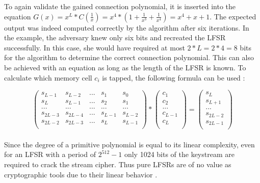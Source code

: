 To again validate the gained connection polynomial, it is inserted into the equation $G(x) = x^L * C(\frac{1}{x}) = x^4 * (1 + \frac{1}{x^3} + \frac{1}{x^4}) = x^4 + x + 1$. The expected output was indeed computed correctly by the algorithm after six iterations. In the example, the adversary knew only six bits and recreated the LFSR successfully. In this case, she would have required at most $2*L=2*4=8$ bits for the algorithm to determine the correct connection polynomial. This can also be achieved with an equation as long as the length of the LFSR is known. To calculate which memory cell $c_i$ is tapped, the following formula can be used \cite[p. 232]{Smart.2016}:

\[
	\begin{pmatrix}
		s_{L-1} & s_{L-2} & ... & s_1 & s_0 \\
		s_L & s_{L-1} & ... & s_2 & s_1 \\
		... & ... & ... & ... & ... \\
		s_{2L-3} & s_{2L-4} & ... & s_{L-1} & s_{L-2} \\
		s_{2L-2} & s_{2L-3} & ... & s_L & s_{L-1} \\
	\end{pmatrix} *
	\begin{pmatrix}
		c_1 \\
		c_2 \\
		... \\
		c_{L-1} \\
		c_{L} \\
	\end{pmatrix} =
	\begin{pmatrix}
		s_{L} \\
		s_{L+1} \\
		... \\
		s_{2L-2} \\
		s_{2L-1} \\
	\end{pmatrix}
\]\\

Since the degree of a primitive polynomial is equal to its linear complexity, even for an LFSR with a period of $2^{512}-1$ only 1024 bits of the keystream are required to crack the stream cipher. Thus pure LFSRs are of no value as cryptographic tools due to their linear behavior \cite[p. 231]{Smart.2016}.